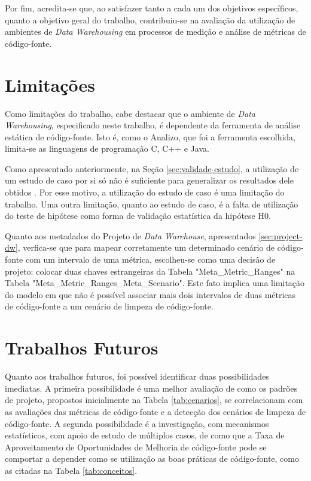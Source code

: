 Por fim, acredita-se que, ao satisfazer tanto a cada um dos objetivos específicos, quanto a objetivo geral do trabalho, contribuiu-se na avaliação da utilização de ambientes de \textit{Data Warehousing} em processos de medição e análise de métricas de código-fonte. 

\section{Limitações}

Como limitações do trabalho, cabe destacar que o ambiente de \textit{Data Warehousing}, especificado neste trabalho, é dependente da ferramenta de análise estática de código-fonte. Isto é, como o Analizo, que foi a ferramenta escolhida, limita-se as linguagens de programação C, C++ e Java.

Como apresentado anteriormente, na Seção \ref{sec:validade-estudo}, a utilização de um estudo de caso por si só não é suficiente para generalizar os resultados dele obtidos \cite{yin2011applications}. Por esse motivo, a utilização do estudo de caso é uma limitação do trabalho. Uma outra limitação, quanto ao estudo de caso, é a falta de utilização do teste de hipótese como forma de validação estatística da hipótese H0.

Quanto aos metadados do Projeto de \textit{Data Warehouse}, apresentados \ref{sec:project-dw}, verfica-se que para mapear corretamente um determinado cenário de código-fonte com um intervalo de uma métrica, escolheu-se como uma decisão de projeto: colocar duas chaves estrangeiras da Tabela "Meta\_Metric\_Ranges" na Tabela "Meta\_Metric\_Ranges\_Meta\_Scenario". Este fato implica uma limitação do modelo em que não é possível associar mais dois intervalos de duas métricas de código-fonte a um cenário de limpeza de código-fonte.  


\section{Trabalhos Futuros}

Quanto aos trabalhos futuros, foi possível identificar duas possibilidades imediatas. A primeira possibilidade é uma melhor avaliação de como os padrões de projeto, propostos inicialmente na Tabela \ref{tab:cenarios}, se correlacionam com as avaliações das métricas de código-fonte e a detecção dos cenários de limpeza de código-fonte. A segunda possibilidade é a investigação, com mecanismos estatísticos, com apoio de estudo de múltiplos casos, de como que a Taxa de Aproveitamento de Oportunidades de Melhoria de código-fonte pode se comportar a depender como se utilização as boas práticas de código-fonte, como as citadas na Tabela \ref{tab:conceitos}.